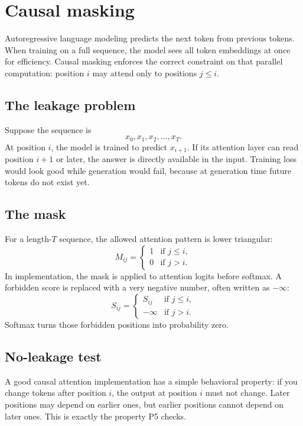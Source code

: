 \section{Causal masking}\label{sec:09}

Autoregressive language modeling predicts the next token from previous tokens.
When training on a full sequence, the model sees all token embeddings at once
for efficiency. Causal masking enforces the correct constraint on that parallel computation:
position $i$ may attend only to positions $j \le i$.

\subsection*{The leakage problem}
Suppose the sequence is
\[
  x_0, x_1, x_2, \dots, x_T.
\]
At position $i$, the model is trained to predict $x_{i+1}$. If its attention
layer can read position $i+1$ or later, the answer is directly available in the
input. Training loss would look good while generation would fail, because at
generation time future tokens do not exist yet.

\subsection*{The mask}
For a length-$T$ sequence, the allowed attention pattern is lower triangular:
\[
  M_{ij} =
  \begin{cases}
    1 & \text{if } j \le i,\\
    0 & \text{if } j > i.
  \end{cases}
\]
In implementation, the mask is applied to attention logits before softmax. A
forbidden score is replaced with a very negative number, often written as
$-\infty$:
\[
  S_{ij} =
  \begin{cases}
    S_{ij} & \text{if } j \le i,\\
    -\infty & \text{if } j > i.
  \end{cases}
\]
Softmax turns those forbidden positions into probability zero.

\subsection*{No-leakage test}
A good causal attention implementation has a simple behavioral property: if you
change tokens after position $i$, the output at position $i$ must not change.
Later positions may depend on earlier ones, but earlier positions cannot depend
on later ones. This is exactly the property P5 checks.

